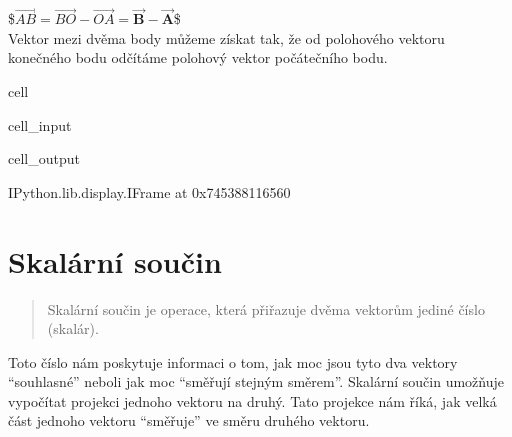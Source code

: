 \documentclass[letterpaper,10pt,english]{jupyterBook}
\begin{document}
\sphinxAtStartPar
\$\(\vec{AB} =  \vec{BO} - \vec{OA}  = \vec{\mathbf{B}} - \vec{\mathbf{A}}\)\$\\
Vektor mezi dvěma body můžeme získat tak, že od polohového vektoru konečného bodu odčítáme polohový vektor počátečního bodu.

\begin{sphinxuseclass}{cell}\begin{sphinxVerbatimInput}

\begin{sphinxuseclass}{cell_input}
\begin{sphinxVerbatim}[commandchars=\\\{\}]
  
\end{sphinxVerbatim}

\end{sphinxuseclass}\end{sphinxVerbatimInput}
\begin{sphinxVerbatimOutput}

\begin{sphinxuseclass}{cell_output}
\begin{sphinxVerbatim}[commandchars=\\\{\}]
\PYGZlt{}IPython.lib.display.IFrame at 0x745388116560\PYGZgt{}
\end{sphinxVerbatim}

\end{sphinxuseclass}\end{sphinxVerbatimOutput}

\end{sphinxuseclass}

\section{Skalární součin}
\label{\detokenize{Prednasky/0_2_Skal_xe1ry_a_vektory:skalarni-soucin}}\begin{quote}

\sphinxAtStartPar
Skalární součin je operace, která přiřazuje dvěma vektorům jediné číslo (skalár).
\end{quote}

\sphinxAtStartPar
Toto číslo nám poskytuje informaci o tom, jak moc jsou tyto dva vektory “souhlasné” neboli jak moc “směřují stejným směrem”. Skalární součin umožňuje vypočítat projekci jednoho vektoru na druhý. Tato projekce nám říká, jak velká část jednoho vektoru “směřuje” ve směru druhého vektoru.
\end{document}
